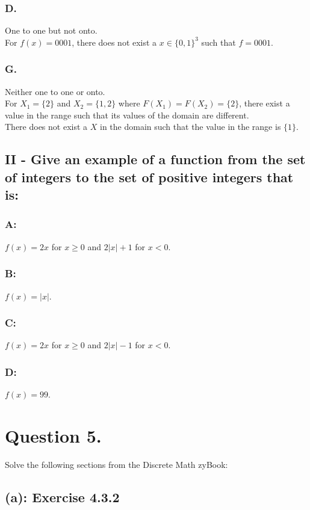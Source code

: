 \documentclass[titlepage]{article}\pagestyle{empty}
\begin{document}
\subsubsection*{D.}
One to one but not onto.\\
For $f(x) = 0001$, there does not exist a $x \in \{0, 1\}^3$ such that $f = 0001$.\\
\subsubsection*{G.}
Neither one to one or onto.\\
For $X_1 = \{2\}$ and $X_2 = \{1, 2\}$ where $F(X_1) = F(X_2) = \{2\}$, there exist a value in the range such that its values of the domain are different.\\
There does not exist a $X$ in the domain such that the value in the range is $\{1\}$.\\
\subsection*{II - Give an example of a function from the set of integers to the set of positive integers that is: }  
\subsubsection*{A:}
$f(x) = 2x$ for $x \ge 0$ and $2|x|+1$ for $x < 0$.
\subsubsection*{B:}
$f(x) = |x|$.
\subsubsection*{C:}
$f(x) = 2x$ for $x \ge 0$ and $2|x|-1$ for $x < 0$.
\subsubsection*{D:}
$f(x) = 99$.

\pagebreak
\section*{Question 5.} Solve the following sections from the Discrete Math zyBook:
\subsection*{(a): Exercise 4.3.2} 
\end{document}
